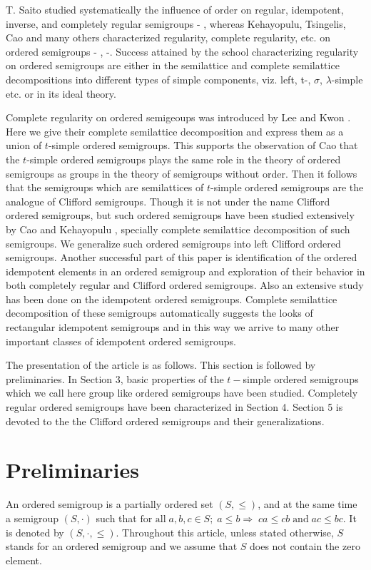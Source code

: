 \documentclass[13pt]{article}
\theoremstyle{definition}
\theoremstyle{remark}
\numberwithin{equation}{section}
\begin{document}
T. Saito studied systematically the influence of order on regular,
idempotent, inverse, and completely regular semigroups
\cite{Saito1962} - \cite{Saito1971}, whereas Kehayopulu, Tsingelis,
Cao and many others characterized regularity, complete regularity,
etc. on ordered semigroups \cite{Cao1999} - \cite{CX2000},
\cite{Ke1990}-\cite{LK}. Success attained by the school
characterizing regularity on ordered semigroups are either in the
semilattice and complete semilattice decompositions into different
types of simple components, viz. left, t-, $\sigma$,
$\lambda$-simple etc. or in its ideal theory.

Complete regularity  on ordered semigeoups was introduced by Lee and
Kwon \cite{LK}. Here we give their  complete semilattice
decomposition and express them as a union of $t$-simple ordered
semigroups. This supports the observation of Cao \cite{CX2000} that
the $t$-simple ordered semigroups plays the same role in the theory
of ordered semigroups as groups in the theory of semigroups without
order. Then it follows that the semigroups which are semilattices of
$t$-simple ordered semigroups are the analogue of Clifford
semigroups. Though it is not under the name Clifford ordered
semigroups, but such ordered semigroups have been studied
extensively by Cao \cite{Cao2000} and Kehayopulu \cite{Ke MJ 92},
specially complete semilattice decomposition of such semigroups. We
generalize such ordered semigroups into left Clifford ordered
semigroups. Another successful part of this paper is identification
of the ordered idempotent elements in an ordered semigroup and
exploration of their behavior in both completely regular and
Clifford ordered semigroups. Also an extensive study has been done
on the idempotent ordered semigroups. Complete semilattice
decomposition of these semigroups automatically suggests the looks
of rectangular idempotent semigroups and in this way we arrive to
many other important classes of idempotent ordered semigroups.

The presentation of the article is as follows. This section is
followed by preliminaries. In Section 3, basic properties of  the
$t-$simple ordered semigroups which we call here group like ordered
semigroups have been studied.  Completely regular ordered semigroups
have been characterized in Section 4. Section 5 is devoted to the
the Clifford ordered semigroups and their generalizations.


\section{Preliminaries}
An ordered semigroup  is a partially ordered set $(S, \leq)$, and at
the same time a semigroup $(S,\cdot)$ such that $ \textrm{for all}
\; a, b , c \in S;  \;a \leq b \Rightarrow
 \;ca \leq cb \;\textrm{and} \;ac \leq bc$.
It is denoted by $(S,\cdot, \leq)$. Throughout this article, unless
stated otherwise, $S$ stands for an ordered semigroup and we assume
that $S$ does not contain the zero element.
\end{document}
